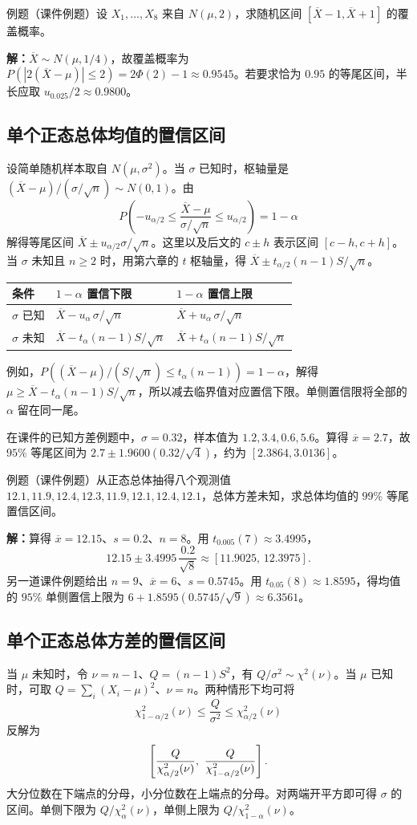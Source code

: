 \documentclass[UTF8,fontset=none,zihao=-4,a4paper]{ctexart}
\newcommand{\example}[1]{\begin{infobox}{例题}#1\end{infobox}}
\newcommand{\solution}{\par\noindent\textbf{解：}}
\begin{document}
\example{（课件例题）设 $X_1,\ldots,X_8$ 来自 $N(\mu,2)$，求随机区间 $[\overline X-1,\overline X+1]$ 的覆盖概率。}
\solution $\overline X\sim N(\mu,1/4)$，故覆盖概率为 $P(|2(\overline X-\mu)|\le2)=2\Phi(2)-1\approx0.9545$。若要求恰为 $0.95$ 的等尾区间，半长应取 $u_{0.025}/2\approx0.9800$。

\subsection{单个正态总体均值的置信区间}
设简单随机样本取自 $N(\mu,\sigma^2)$。当 $\sigma$ 已知时，枢轴量是 $(\overline X-\mu)/(\sigma/\sqrt n)\sim N(0,1)$。由
\[
P\!\left(-u_{\alpha/2}\le\frac{\overline X-\mu}{\sigma/\sqrt n}\le u_{\alpha/2}\right)=1-\alpha
\]
解得等尾区间 $\overline X\pm u_{\alpha/2}\sigma/\sqrt n$。这里以及后文的 $c\pm h$ 表示区间 $[c-h,c+h]$。当 $\sigma$ 未知且 $n\ge2$ 时，用第六章的 $t$ 枢轴量，得 $\overline X\pm t_{\alpha/2}(n-1)S/\sqrt n$。

\begin{center}\begin{tabularx}{\linewidth}{l Y Y}
\toprule 条件 & $1-\alpha$ 置信下限 & $1-\alpha$ 置信上限\\\midrule
$\sigma$ 已知 & $\overline X-u_\alpha\,\sigma/\sqrt n$ & $\overline X+u_\alpha\,\sigma/\sqrt n$\\
$\sigma$ 未知 & $\overline X-t_\alpha(n-1)S/\sqrt n$ & $\overline X+t_\alpha(n-1)S/\sqrt n$\\
\bottomrule
\end{tabularx}\end{center}
例如，$P((\overline X-\mu)/(S/\sqrt n)\le t_\alpha(n-1))=1-\alpha$，解得 $\mu\ge\overline X-t_\alpha(n-1)S/\sqrt n$，所以减去临界值对应置信下限。单侧置信限将全部的 $\alpha$ 留在同一尾。

在课件的已知方差例题中，$\sigma=0.32$，样本值为 $1.2,3.4,0.6,5.6$。算得 $\overline x=2.7$，故 $95\%$ 等尾区间为 $2.7\pm1.9600(0.32/\sqrt4)$，约为 $[2.3864,3.0136]$。

\example{（课件例题）从正态总体抽得八个观测值 $12.1,11.9,12.4,12.3,11.9,12.1,12.4,12.1$，总体方差未知，求总体均值的 $99\%$ 等尾置信区间。}
\solution 算得 $\overline x=12.15$、$s=0.2$、$n=8$。用 $t_{0.005}(7)\approx3.4995$，
\[
12.15\pm3.4995\,\frac{0.2}{\sqrt8}\approx[11.9025,\,12.3975].
\]
另一道课件例题给出 $n=9$、$\overline x=6$、$s=0.5745$。用 $t_{0.05}(8)\approx1.8595$，得均值的 $95\%$ 单侧置信上限为 $6+1.8595(0.5745/\sqrt9)\approx6.3561$。

\subsection{单个正态总体方差的置信区间}
当 $\mu$ 未知时，令 $\nu=n-1$、$Q=(n-1)S^2$，有 $Q/\sigma^2\sim\chi^2(\nu)$。当 $\mu$ 已知时，可取 $Q=\sum_i(X_i-\mu)^2$、$\nu=n$。两种情形下均可将
\[
\chi^2_{1-\alpha/2}(\nu)\le \frac{Q}{\sigma^2}\le\chi^2_{\alpha/2}(\nu)
\]
反解为
\[
\left[\frac{Q}{\chi^2_{\alpha/2}(\nu)},\ \relax
      \frac{Q}{\chi^2_{1-\alpha/2}(\nu)}\right].
\]
大分位数在下端点的分母，小分位数在上端点的分母。对两端开平方即可得 $\sigma$ 的区间。单侧下限为 $Q/\chi^2_\alpha(\nu)$，单侧上限为 $Q/\chi^2_{1-\alpha}(\nu)$。
\end{document}
